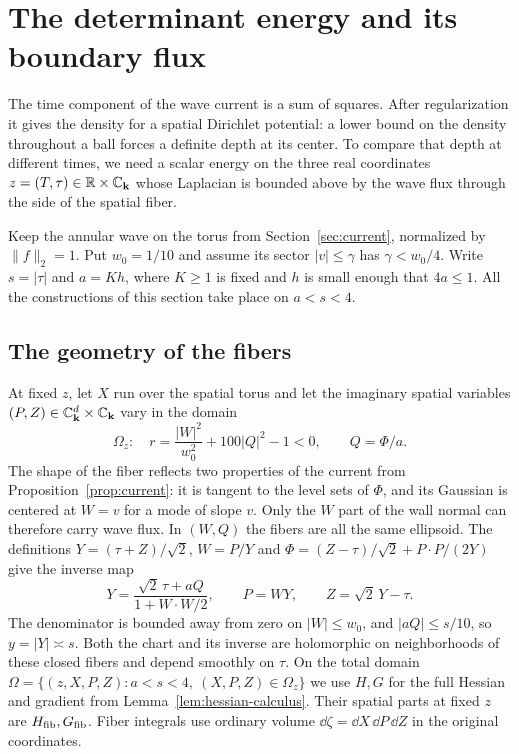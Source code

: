 \section{The determinant energy and its boundary flux}
\label{sec:energy}

The time component of the wave current is a sum of squares. After
regularization it gives the density for a spatial Dirichlet potential:
a lower bound on the density throughout a ball forces a definite
depth at its center. To compare that depth at different times, we
need a scalar energy on the three real coordinates
$z=(T,\tau)\in\mathbb R\times\mathbb C_{\mathbf k}$ whose Laplacian is bounded
above by the wave flux through the side of the spatial fiber.

Keep the annular wave on the torus from Section~\ref{sec:current},
normalized by $\|f\|_2=1$. Put $w_0=1/10$ and assume its sector
$|v|\le\gamma$ has $\gamma<w_0/4$.
Write $s=|\tau|$ and $a=Kh$, where $K\ge1$ is fixed and $h$ is small
enough that $4a\le1$. All the constructions of this section take place
on $a<s<4$.

\subsection{The geometry of the fibers}

At fixed $z$, let $X$ run over the spatial torus and let the imaginary
spatial variables $(P,Z)\in\mathbb C_{\mathbf k}^d\times\mathbb C_{\mathbf k}$ vary
in the domain
\begin{equation}\label{eq:fiber-domain}
 \Omega_z:\quad r=\frac{|W|^2}{w_0^2}+100|Q|^2-1<0,
 \qquad Q=\Phi/a.
\end{equation}
The shape of the fiber reflects two properties of the current from
Proposition~\ref{prop:current}: it is tangent to the level sets of
$\Phi$, and its Gaussian is centered at $W=v$ for a mode of slope $v$.
Only the $W$ part of the wall normal can therefore carry wave flux.
In $(W,Q)$ the fibers are all the same ellipsoid. The definitions
$Y=(\tau+Z)/\sqrt2$, $W=P/Y$ and
$\Phi=(Z-\tau)/\sqrt2+P\cdot P/(2Y)$ give the inverse map
\begin{equation}\label{eq:fiber-inverse}
 Y=\frac{\sqrt2\,\tau+aQ}{1+W\cdot W/2},\qquad P=WY,\qquad
 Z=\sqrt2\,Y-\tau .
\end{equation}
The denominator is bounded away from zero on $|W|\le w_0$, and
$|aQ|\le s/10$, so $y=|Y|\asymp s$. Both the chart and its inverse
are holomorphic on neighborhoods of these closed fibers and depend
smoothly on $\tau$. On the total domain
$\Omega=\{(z,X,P,Z):a<s<4,\ (X,P,Z)\in\Omega_z\}$ we use $H,G$ for
the full Hessian and gradient from Lemma~\ref{lem:hessian-calculus}.
Their spatial parts at fixed $z$ are $H_{\rm fib},G_{\rm fib}$. Fiber
integrals use ordinary volume $\dd\zeta=\dd X\,\dd P\,\dd Z$ in the
original coordinates.


